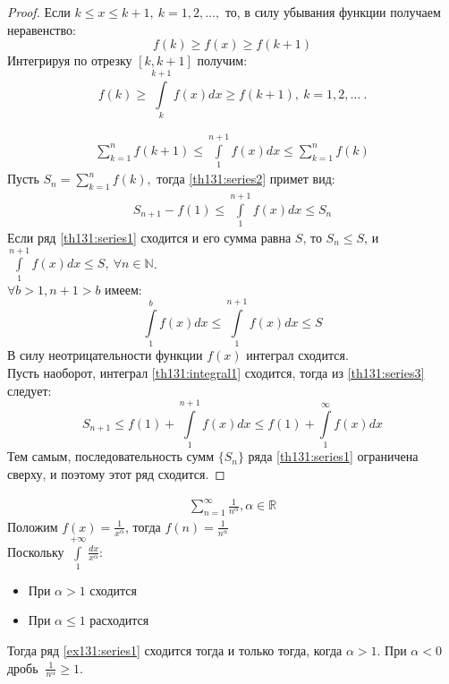 \begin{proof}
  Если $k \leq x \leq k + 1, \ k = 1, 2, \dots,$ то, в силу убывания функции
  получаем неравенство:
  $$f(k) \geq f(x) \geq f(k + 1)$$
  Интегрируя по отрезку $[k, k + 1]$ получим:
  $$f(k) \geq \int\limits_k^{k+1} f(x) dx \geq f(k+1), \ k = 1, 2, \dots \ .$$

  \begin{gather}
    \label{th131:series2}
    \sum\limits_{k = 1}^{n} f(k+1) \leq \int\limits_1^{n+1} f(x) dx \leq
    \sum\limits_{k = 1}^{n} f(k)
  \end{gather}
  Пусть $S_n = \sum\limits_{k = 1}^{n} f(k),$ тогда \eqref{th131:series2} примет вид:
  \begin{gather}
    \label{th131:series3}
    S_{n+1} - f(1) \leq \int\limits_1^{n+1} f(x) dx \leq S_n
  \end{gather}
  Если ряд \eqref{th131:series1} сходится и его сумма равна $S$, то $S_n \leq S$,
  и $\int\limits_1^{n+1} f(x) dx \leq S, \ \forall n \in \mathbb{N}$. \\
  $\forall b > 1, n + 1 > b$ имеем:
  $$\int\limits_1^b f(x) dx \leq \int\limits_1^{n+1} f(x) dx \leq S$$
  В силу неотрицательности функции $f(x)$ интеграл сходится. \\
  Пусть наоборот, интеграл \eqref{th131:integral1} сходится, тогда из
  \eqref{th131:series3} следует:
  $$S_{n+1} \leq f(1) + \int\limits_1^{n+1} f(x) dx
  \leq f(1) + \int\limits_1^\infty f(x) dx$$
  Тем самым, последовательность сумм $\{S_n\}$ ряда \eqref{th131:series1}
  ограничена сверху, и поэтому этот ряд сходится.
\end{proof}

\begin{example}
  \label{th131:example131}
  \begin{gather}
    \label{ex131:series1}
    \sum\limits_{n = 1}^{\infty} \frac{1}{n^\alpha}, \alpha \in \mathbb{R}
  \end{gather}
  Положим $f(x) = \frac{1}{x^\alpha}$, тогда $f(n) = \frac{1}{n^\alpha}$ \\
  Поскольку $\int\limits_1^{+\infty} \frac{dx}{x^\alpha}$:
  \begin{itemize}
    \item При $\alpha > 1$ сходится
    \item При $\alpha \leq 1$ расходится
  \end{itemize}
  Тогда ряд \eqref{ex131:series1} сходится тогда и только тогда, когда $\alpha > 1$.
  При $\alpha < 0 \ $ дробь $ \ \frac{1}{n^\alpha} \geq 1$.
\end{example}

